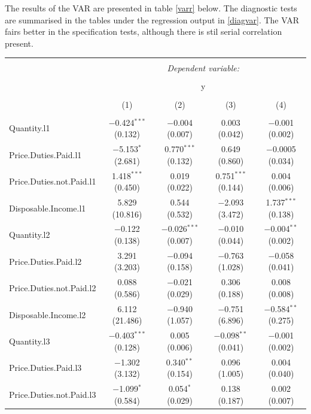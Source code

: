 \documentclass[11pt,preprint, authoryear]{elsarticle}
\let\origtable\table
\let\endorigtable\endtable
\renewenvironment{table}[1][2] {
    \expandafter\origtable\expandafter[H]
} {
    \endorigtable
}
\numberwithin{equation}{section}
\numberwithin{figure}{section}
\numberwithin{table}{section}
\begin{document}
The results of the VAR are presented in table \ref{varr} below. The
diagnostic tests are summarised in the tables under the regression
output in \ref{diagvar}. The VAR fairs better in the specification
tests, although there is stil serial correlation present.

\newpage

\begin{table}[!htbp] \centering 
  \caption{Vector Autoregression \label{varr}} 
  \label{} 
\footnotesize 
\begin{tabular}{@{\extracolsep{1pt}}lcccc} 
\\[-1.8ex]\hline 
\hline \\[-1.8ex] 
 & \multicolumn{4}{c}{\textit{Dependent variable:}} \\ 
\cline{2-5} 
\\[-1.8ex] & \multicolumn{4}{c}{y} \\ 
\\[-1.8ex] & (1) & (2) & (3) & (4)\\ 
\hline \\[-1.8ex] 
 Quantity.l1 & $-$0.424$^{***}$ (0.132) & $-$0.004 (0.007) & 0.003 (0.042) & $-$0.001 (0.002) \\ 
  Price.Duties.Paid.l1 & $-$5.153$^{*}$ (2.681) & 0.770$^{***}$ (0.132) & 0.649 (0.860) & $-$0.0005 (0.034) \\ 
  Price.Duties.not.Paid.l1 & 1.418$^{***}$ (0.450) & 0.019 (0.022) & 0.751$^{***}$ (0.144) & 0.004 (0.006) \\ 
  Disposable.Income.l1 & 5.829 (10.816) & 0.544 (0.532) & $-$2.093 (3.472) & 1.737$^{***}$ (0.138) \\ 
  Quantity.l2 & $-$0.122 (0.138) & $-$0.026$^{***}$ (0.007) & $-$0.010 (0.044) & $-$0.004$^{**}$ (0.002) \\ 
  Price.Duties.Paid.l2 & 3.291 (3.203) & $-$0.094 (0.158) & $-$0.763 (1.028) & $-$0.058 (0.041) \\ 
  Price.Duties.not.Paid.l2 & 0.088 (0.586) & $-$0.021 (0.029) & 0.306 (0.188) & 0.008 (0.008) \\ 
  Disposable.Income.l2 & 6.112 (21.486) & $-$0.940 (1.057) & $-$0.751 (6.896) & $-$0.584$^{**}$ (0.275) \\ 
  Quantity.l3 & $-$0.403$^{***}$ (0.128) & 0.005 (0.006) & $-$0.098$^{**}$ (0.041) & $-$0.001 (0.002) \\ 
  Price.Duties.Paid.l3 & $-$1.302 (3.132) & 0.340$^{**}$ (0.154) & 0.096 (1.005) & 0.004 (0.040) \\ 
  Price.Duties.not.Paid.l3 & $-$1.099$^{*}$ (0.584) & 0.054$^{*}$ (0.029) & 0.138 (0.187) & 0.002 (0.007) \\ 

\end{tabular}
\end{table}
\end{document}
